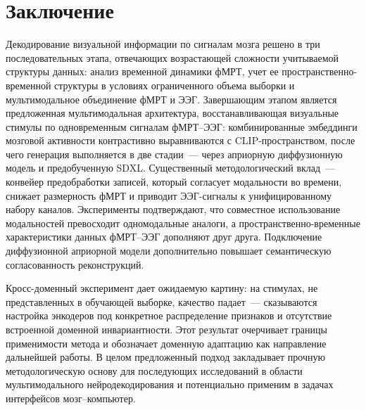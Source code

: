\cleardoublepage
{}
{}
\section*{Заключение}

Декодирование визуальной информации по сигналам мозга решено в три последовательных этапа, отвечающих возрастающей сложности учитываемой структуры данных: анализ временной динамики фМРТ, учет ее пространственно-временной структуры в условиях ограниченного объема выборки и мультимодальное объединение фМРТ и ЭЭГ. Завершающим этапом является предложенная мультимодальная архитектура, восстанавливающая визуальные стимулы по одновременным сигналам фМРТ--ЭЭГ: комбинированные эмбеддинги мозговой активности контрастивно выравниваются с CLIP-пространством, после чего генерация выполняется в две стадии~--- через априорную диффузионную модель и предобученную SDXL. Существенный методологический вклад~--- конвейер предобработки записей, который согласует модальности во времени, снижает размерность фМРТ и приводит ЭЭГ-сигналы к унифицированному набору каналов. Эксперименты подтверждают, что совместное использование модальностей превосходит одномодальные аналоги, а пространственно-временные характеристики данных фМРТ--ЭЭГ дополняют друг друга. Подключение диффузионной априорной модели дополнительно повышает семантическую согласованность реконструкций.

Кросс-доменный эксперимент дает ожидаемую картину: на стимулах, не представленных в обучающей выборке, качество падает~--- сказываются настройка энкодеров под конкретное распределение признаков и отсутствие встроенной доменной инвариантности. Этот результат очерчивает границы применимости метода и обозначает доменную адаптацию как направление дальнейшей работы. В целом предложенный подход закладывает прочную методологическую основу для последующих исследований в области мультимодального нейродекодирования и потенциально применим в задачах интерфейсов мозг--компьютер.
